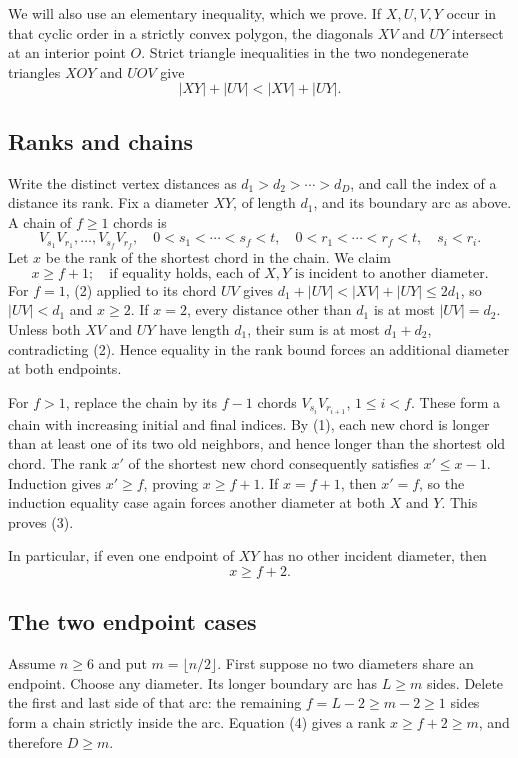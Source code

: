 We will also use an elementary inequality, which we prove. If $X,U,V,Y$ occur in that cyclic order in a strictly convex polygon, the diagonals $XV$ and $UY$ intersect at an interior point $O$. Strict triangle inequalities in the two nondegenerate triangles $XOY$ and $UOV$ give
\[
|XY|+|UV|<|XV|+|UY|.
\tag{2}
\]

\subsection{Ranks and chains}
Write the distinct vertex distances as $d_1>d_2>\cdots>d_D$, and call the index of a distance its rank. Fix a diameter $XY$, of length $d_1$, and its boundary arc as above. A chain of $f\geq1$ chords is
\[
V_{s_1}V_{r_1},\ldots,V_{s_f}V_{r_f},
\quad 0<s_1<\cdots<s_f<t,\quad 0<r_1<\cdots<r_f<t,\quad s_i<r_i.
\]
Let $x$ be the rank of the shortest chord in the chain. We claim
\[
x\geq f+1;
\quad\text{if equality holds, each of }X,Y\text{ is incident to another diameter.}
\tag{3}
\]
For $f=1$, (2) applied to its chord $UV$ gives $d_1+|UV|<|XV|+|UY|\leq2d_1$, so $|UV|<d_1$ and $x\geq2$. If $x=2$, every distance other than $d_1$ is at most $|UV|=d_2$. Unless both $XV$ and $UY$ have length $d_1$, their sum is at most $d_1+d_2$, contradicting (2). Hence equality in the rank bound forces an additional diameter at both endpoints.

For $f>1$, replace the chain by its $f-1$ chords $V_{s_i}V_{r_{i+1}}$, $1\leq i<f$. These form a chain with increasing initial and final indices. By (1), each new chord is longer than at least one of its two old neighbors, and hence longer than the shortest old chord. The rank $x'$ of the shortest new chord consequently satisfies $x'\leq x-1$. Induction gives $x'\geq f$, proving $x\geq f+1$. If $x=f+1$, then $x'=f$, so the induction equality case again forces another diameter at both $X$ and $Y$. This proves (3).

In particular, if even one endpoint of $XY$ has no other incident diameter, then
\[
x\geq f+2.
\tag{4}
\]

\subsection{The two endpoint cases}
Assume $n\geq6$ and put $m=\lfloor n/2\rfloor$. First suppose no two diameters share an endpoint. Choose any diameter. Its longer boundary arc has $L\geq m$ sides. Delete the first and last side of that arc: the remaining $f=L-2\geq m-2\geq1$ sides form a chain strictly inside the arc. Equation (4) gives a rank $x\geq f+2\geq m$, and therefore $D\geq m$.

